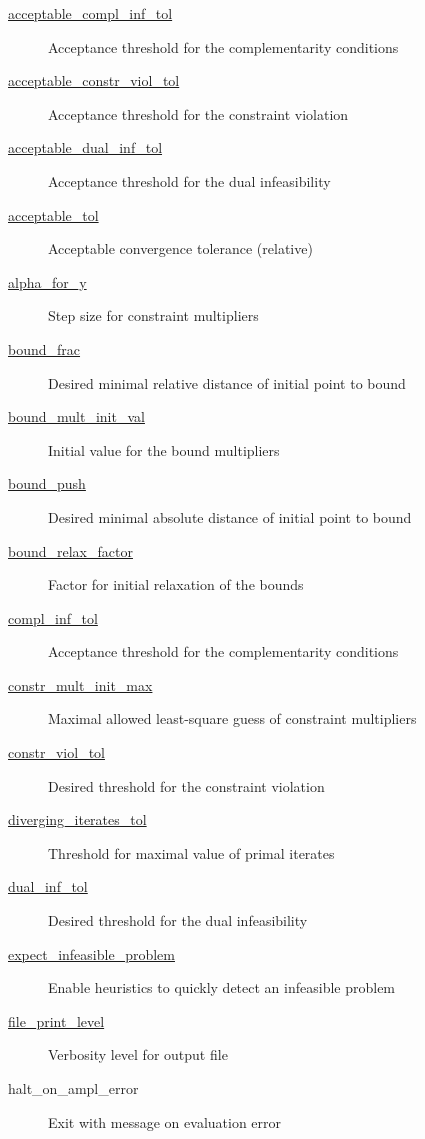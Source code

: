 \begin{description}
\item[{\hyperref[opt:acceptable_compl_inf_tol]{acceptable\_compl\_inf\_tol}}] Acceptance threshold for the complementarity conditions
\item[{\hyperref[opt:acceptable_constr_viol_tol]{acceptable\_constr\_viol\_tol}}] Acceptance threshold for the constraint violation
\item[{\hyperref[opt:acceptable_dual_inf_tol]{acceptable\_dual\_inf\_tol}}] Acceptance threshold for the dual infeasibility
\item[{\hyperref[opt:acceptable_tol]{acceptable\_tol}}] Acceptable convergence tolerance (relative)
\item[{\hyperref[opt:alpha_for_y]{alpha\_for\_y}}] Step size for constraint multipliers
\item[{\hyperref[opt:bound_frac]{bound\_frac}}] Desired minimal relative distance of initial point to bound
\item[{\hyperref[opt:bound_mult_init_val]{bound\_mult\_init\_val}}] Initial value for the bound multipliers
\item[{\hyperref[opt:bound_push]{bound\_push}}] Desired minimal absolute distance of initial point to bound
\item[{\hyperref[opt:bound_relax_factor]{bound\_relax\_factor}}] Factor for initial relaxation of the bounds
\item[{\hyperref[opt:compl_inf_tol]{compl\_inf\_tol}}] Acceptance threshold for the complementarity conditions
\item[{\hyperref[opt:constr_mult_init_max]{constr\_mult\_init\_max}}] Maximal allowed least-square guess of constraint multipliers
\item[{\hyperref[opt:constr_viol_tol]{constr\_viol\_tol}}] Desired threshold for the constraint violation
\item[{\hyperref[opt:diverging_iterates_tol]{diverging\_iterates\_tol}}] Threshold for maximal value of primal iterates
\item[{\hyperref[opt:dual_inf_tol]{dual\_inf\_tol}}] Desired threshold for the dual infeasibility
\item[{\hyperref[opt:expect_infeasible_problem]{expect\_infeasible\_problem}}] Enable heuristics to quickly detect an infeasible problem
\item[{\hyperref[opt:file_print_level]{file\_print\_level}}] Verbosity level for output file
\item[halt\_on\_ampl\_error] Exit with message on evaluation error

\end{description}
